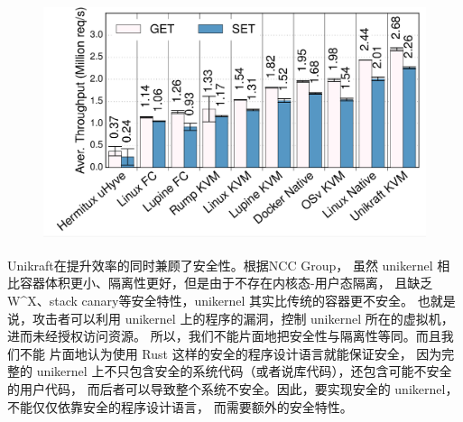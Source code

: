 \documentclass[UTF8,fontset=none,linespread=1.15]{ctexart}
\let\nosupcite\cite
\renewcommand*{\cite}[1]{\textsuperscript{\nosupcite{#1}}}
\begin{document}
\begin{figure}[H]
\begin{minipage}{0.32\linewidth}
\includegraphics[width=1\linewidth]{pictures/Unikraft-throughput.png}
\caption{}
\end{minipage}
\end{figure}

Unikraft在提升效率的同时兼顾了安全性。根据NCC Group\cite{bib:unikernel-secuirty}，
虽然 unikernel 相比容器体积更小、隔离性更好，但是由于不存在内核态-用户态隔离，
且缺乏W\^{}X、stack canary等安全特性，unikernel 其实比传统的容器更不安全。
也就是说，攻击者可以利用 unikernel 上的程序的漏洞，控制 unikernel 所在的虚拟机，
进而未经授权访问资源。
所以，我们不能片面地把安全性与隔离性等同。而且我们不能
片面地认为使用 Rust 这样的安全的程序设计语言就能保证安全，
因为完整的 unikernel 上不只包含安全的系统代码（或者说库代码），还包含可能不安全的用户代码，
而后者可以导致整个系统不安全。因此，要实现安全的 unikernel，不能仅仅依靠安全的程序设计语言，
而需要额外的安全特性。
\end{document}
